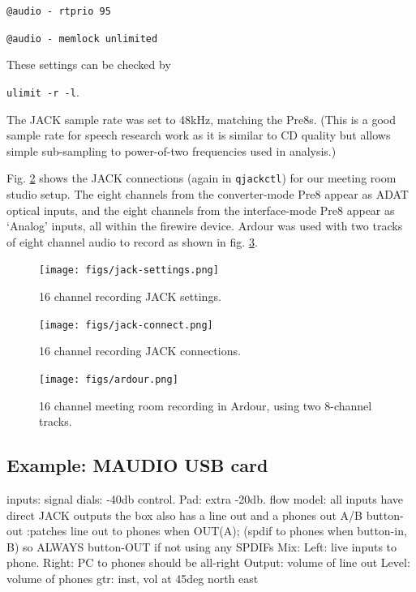 \documentclass[oneside,english]{scrbook}
\begin{document}
{\tt @audio - rtprio 95 }

{\tt @audio - memlock unlimited }

These settings can be checked by

{\tt ulimit -r -l}.

The JACK sample rate was set to 48kHz, matching the Pre8s.  (This is a good sample rate for speech research work as it is similar to CD quality but allows simple sub-sampling to power-of-two frequencies used in analysis.)

Fig. \ref{fig:jack-connect} shows the JACK connections (again in {\tt qjackctl}) for our meeting room studio setup.  The eight channels from the converter-mode Pre8 appear as ADAT optical inputs, and the eight channels from the interface-mode Pre8 appear as `Analog' inputs, all within the firewire device.  Ardour was used with two tracks of eight channel audio to record as shown in fig. \ref{fig:ardour}.



\begin{figure}
  \centering
  \texttt{[image: figs/jack-settings.png]}
  \caption{16 channel recording JACK settings.}
  \label{fig:jack-settings}
\end{figure}

\begin{figure}
  \centering
  \texttt{[image: figs/jack-connect.png]}
  \caption{16 channel recording JACK connections.}
  \label{fig:jack-connect}
\end{figure}

\begin{figure}
  \centering
  \texttt{[image: figs/ardour.png]}
  \caption{16 channel meeting room recording in Ardour, using two 8-channel tracks.}
  \label{fig:ardour}
\end{figure}


\subsection{Example: MAUDIO USB card}
    inputs:
	signal dials: -40db control.   Pad: extra -20db.
    flow model:
	all inputs have direct JACK outputs
		the box also has a line out and a phones out
	A/B button-out :patches line out to phones when OUT(A);  
		(spdif to phones when button-in, B)
		so ALWAYS button-OUT if not using any SPDIFs
	Mix: Left: live inputs to phone.  Right: PC to phones
		should be all-right
	Output: volume of line out
	Level: volume of phones
	gtr: inst, vol at 45deg north east
\end{document}
